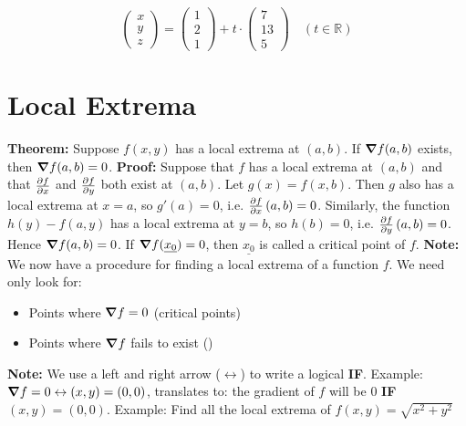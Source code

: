 \documentclass{article}
\newcommand{\n}{\leavevmode \newline} %
\newcommand{\nn}{\leavevmode \newline \newline} %
\newcommand{\R}{\mathbb{R}} %
\numberwithin{equation}{subsection} %
\begin{document}
\begin{equation}
    \begin{pmatrix}
    x\\y\\z
    \end{pmatrix}
    =
    \begin{pmatrix}
    1\\2\\1
    \end{pmatrix}
    +
    t\cdot
    \begin{pmatrix}
    7\\13\\5
    \end{pmatrix}
    \quad (t\in\R)
\end{equation}
\section{Local Extrema}
\textbf{Theorem:} Suppose $f(x,y)$ has a local extrema at $(a,b)$. If $\grad f(a,b)$ exists, then $\grad f(a,b)=0$.
\nn
\textbf{Proof:} Suppose that $f$ has a local extrema at $(a,b)$ and that $\pdv{f}{x}$ and $\pdv{f}{y}$ both exist at $(a,b)$.
\n
Let $g(x)=f(x,b)$. Then $g$ also has a local extrema at $x=a$, so $g'(a)=0$, i.e. $\pdv{f}{x}\left(a,b\right)=0$. Similarly, the function $h(y)-f(a,y)$ has a local extrema at $y=b$, so $h(b)=0$, i.e. $\pdv{f}{y}\left(a,b\right)=0$. Hence $\grad f(a,b)=0$.
\nn
If $\grad f(\underline{x_0})=0$, then $\underline{x_0}$ is called a critical point of $f$.
\nn
\textbf{Note:} We now have a procedure for finding a local extrema of a function $f$. We need only look for:

\begin{itemize}
    \item Points where $\grad f=0$ (critical points)
    \item Points where $\grad f$ fails to exist ()
\end{itemize}
\n
\textbf{Note: } We use a left and right arrow ($\leftrightarrow$) to write a logical \textbf{IF}. Example: $\grad f = 0 \leftrightarrow (x,y)=(0,0)$, translates to: the gradient of $f$ will be 0 \textbf{IF} $(x,y)=(0,0)$.
\nn
Example: Find all the local extrema of $f(x,y)=\sqrt{x^2+y^2}$
\end{document}
